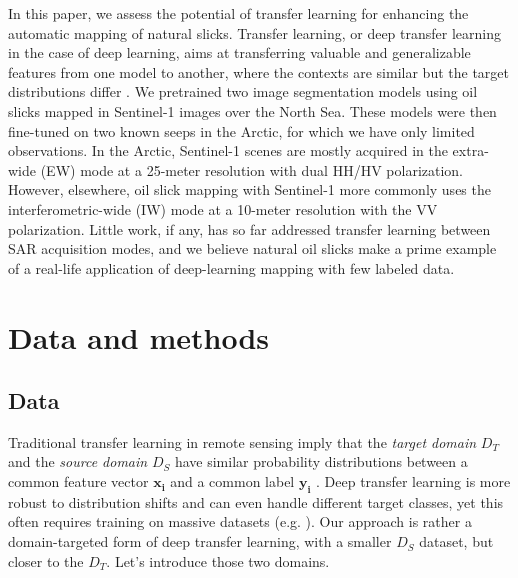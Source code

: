 \documentclass[lettersize,journal]{IEEEtran}
\begin{document}
In this paper, we assess the potential of transfer learning for enhancing the automatic mapping of natural slicks. Transfer learning, or deep transfer learning in the case of deep learning, aims at 
transferring valuable and generalizable features from one model to another, where the contexts are similar but the target distributions differ \cite{goodfellowDeepLearning2016}. 
We pretrained two image segmentation models using oil slicks mapped in Sentinel-1 images over the North Sea. These models were then fine-tuned on two known seeps in the Arctic, for which we have only 
limited observations. In the Arctic, Sentinel-1 scenes are mostly acquired in the extra-wide (EW) mode at a 25-meter resolution with dual HH/HV polarization. However, elsewhere, oil slick mapping with 
Sentinel-1 more commonly uses the interferometric-wide (IW) mode at a 10-meter resolution with the VV polarization.
Little work, if any, has so far addressed transfer learning between SAR acquisition modes, and we believe natural oil slicks make a 
prime example of a real-life application of deep-learning mapping with few labeled data. 

\section{Data and methods}
\subsection{Data}
Traditional transfer learning in remote sensing imply that the \textit{target domain} $\mathit{D}_T$ and the \textit{source domain} $\mathit{D}_S$ have similar probability distributions 
between a common feature vector $\mathbf{x_i}$ and a common label $\mathbf{y_i}$ \cite{tuiaDomainAdaptationClassification2016}. Deep transfer learning is more robust to distribution shifts 
and can even handle different target classes, yet this often requires training on massive datasets (e.g. \cite{heDeepResidualLearning2015,kirillovSegmentAnything2023}). 
Our approach is rather a domain-targeted form of deep transfer learning, with a smaller $\mathit{D}_S$ dataset, but closer to the $\mathit{D}_T$. Let's introduce those two domains.
\end{document}
